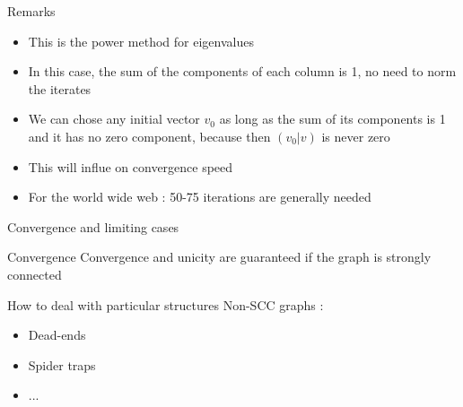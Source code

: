\documentclass[10pt]{beamer}
\begin{document}
\begin{frame}{Remarks}
\begin{itemize}
\item This is the power method for eigenvalues
\item In this case, the sum of the components of each column is 1, no need to norm the iterates
\item We can chose any initial vector $v_0$ as long as the sum of its components is 1 and it has no zero component, because then $(v_0|v)$ is never zero
\item This will influe on convergence speed
\item For the world wide web : 50-75 iterations are generally needed
\end{itemize}
\end{frame}

\begin{frame}{Convergence and limiting cases}
\begin{block}{Convergence}
Convergence and unicity are guaranteed if the graph is strongly connected
\end{block}
\begin{block}{How to deal with particular structures}
Non-SCC graphs : 
\begin{itemize}
\item Dead-ends
\item Spider traps
\item ...
\end{itemize}
\end{block}
\end{frame}
\end{document}
